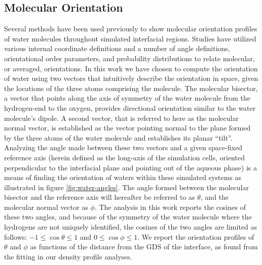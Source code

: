
\subsection{Molecular Orientation}
Several methods have been used previously to show molecular orientation profiles of water molecules throughout simulated interfacial regions.\cite{Wick2006c,Thomas2007,Wick2008a,Wick2007,Fan2009,Galamba2008,Ishiyama2007,Hore2007,Hore2008} Studies have utilized various internal coordinate definitions and a number of angle definitions, orientational order parameters, and probability distributions to relate molecular, or averaged, orientations. In this work we have chosen to compute the orientation of water using two vectors that intuitively describe the orientation in space, given the locations of the three atoms comprising the molecule. The molecular bisector, a vector that points along the axis of symmetry of the water molecule from the hydrogen-end to the oxygen, provides directional orientation similar to the water molecule's dipole. A second vector, that is referred to here as the molecular normal vector, is established as the vector pointing normal to the plane formed by the three atoms of the water molecule and establishes its planar ``tilt''. Analyzing the angle made between these two vectors and a given space-fixed reference axis (herein defined as the long-axis of the simulation cells, oriented perpendicular to the interfacial plane and pointing out of the aqueous phase) is a means of finding the orientation of waters within these simulated systems as illustrated in figure \ref{fig:water-angles}. The angle formed between the molecular bisector and the reference axis will hereafter be referred to as $\theta$, and the molecular normal vector as $\phi$. The analysis in this work reports the cosines of these two angles, and because of the symmetry of the water molecule where the hydrogens are not uniquely identified, the cosines of the two angles are limited as follows: $-1\le\cos\theta\le1$ and $0\le\cos\phi\le1$. We report the orientation profiles of $\theta$ and $\phi$ as functions of the distance from the GDS of the interface, as found from the fitting in our density profile analyses.

